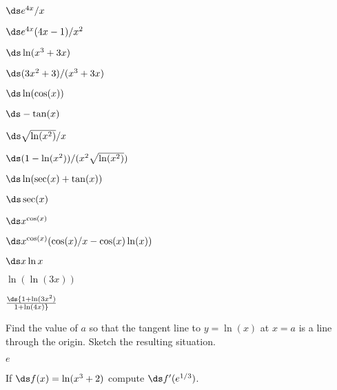 \begin{enumialphparenastyle}
\begin{ex} 
$\ds e^{4x}/x$
\begin{sol}
	$\ds e^{4x}(4x-1)/x^2$
\end{sol}
\end{ex}

\begin{ex} 
$\ds \ln(x^3+3x)$
\begin{sol}
	$\ds (3x^2+3)/(x^3+3x)$
\end{sol}
\end{ex}

\begin{ex} 
$\ds \ln(\cos(x))$
\begin{sol}
	$\ds -\tan(x)$
\end{sol}
\end{ex}

\begin{ex} 
$\ds\sqrt{\ln(x^2)}/x$
\begin{sol}
	$\ds (1-\ln(x^2))/(x^2\sqrt{\ln(x^2)})$
\end{sol}
\end{ex}

\begin{ex} 
$\ds \ln(\sec(x) + \tan(x))$
\begin{sol}
	$\ds \sec(x)$
\end{sol}
\end{ex}

\begin{ex} 
$\ds x^{\cos(x)}$
\begin{sol}
	$\ds x^{\cos(x)}(\cos(x)/x-\cos(x)\ln(x))$
\end{sol}
\end{ex}

\begin{ex} 
$\ds x\ln x$
\end{ex}

\begin{ex} 
$\ln (\ln (3x) )$
\end{ex}

\begin{ex} 
$\ds {1+\ln (3x^2 )\over 1+ \ln(4x)}$
\end{ex}

\begin{ex} 
Find the value of $a$ so that the tangent line to
$y=\ln(x)$ at $x=a$ is a line through the origin.  Sketch the
 resulting situation.
\begin{sol}
$e$
\end{sol}
\end{ex}


\begin{ex} 
If $\ds f(x) = \ln(x^3 + 2)$ compute $\ds f'(e^{1/3})$.
\end{ex}

\end{enumialphparenastyle}
